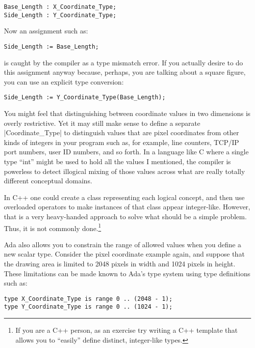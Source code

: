 \begin{lstlisting}
Base_Length : X_Coordinate_Type;
Side_Length : Y_Coordinate_Type;
\end{lstlisting}

\noindent Now an assignment such as:

\begin{lstlisting}
Side_Length := Base_Length;
\end{lstlisting}

\noindent is caught by the compiler as a type mismatch error. If you actually desire to do this
assignment anyway because, perhaps, you are talking about a square figure, you can use an
explicit type conversion:

\begin{lstlisting}
Side_Length := Y_Coordinate_Type(Base_Length);
\end{lstlisting}

You might feel that distinguishing between coordinate values in two dimensions is overly
restrictive. Yet it may still make sense to define a separate |Coordinate_Type| to distinguish
values that are pixel coordinates from other kinds of integers in your program such as, for
example, line counters, TCP/IP port numbers, user ID numbers, and so forth. In a language like C
where a single type ``int'' might be used to hold all the values I mentioned, the compiler is
powerless to detect illogical mixing of those values across what are really totally different
conceptual domains.

In C++ one could create a class representing each logical concept, and then use overloaded
operators to make instances of that class appear integer-like. However, that is a very
heavy-handed approach to solve what should be a simple problem. Thus, it is not commonly
done.\footnote{If you are a C++ person, as an exercise try writing a C++ template that allows
  you to ``easily'' define distinct, integer-like types.}

Ada also allows you to constrain the range of allowed values when you define a new scalar type.
Consider the pixel coordinate example again, and suppose that the drawing area is limited to
2048 pixels in width and 1024 pixels in height. These limitations can be made known to Ada's
type system using type definitions such as:

\begin{lstlisting}
type X_Coordinate_Type is range 0 .. (2048 - 1);
type Y_Coordinate_Type is range 0 .. (1024 - 1);
\end{lstlisting}

